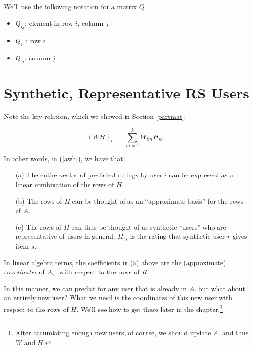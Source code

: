 We'll use the following notation for a matrix $Q$

\begin{itemize}

\item $Q_{ij}$:  element in row $i$, column $j$

\item $Q_{i \cdot}$:  row $i$

\item $Q_{\cdot j}$:  column $j$

\end{itemize}

\section{Synthetic, Representative RS Users}

Note the key relation, which we showed in Section \ref{partmat}:

\begin{equation}
(WH)_{i \cdot} = \sum_{m=1}^k W_{im} H_{m \cdot}
\end{equation}

In other words, in (\ref{awh}), we have that:

\begin{itemize}

\item [(a)] The entire vector of predicted ratings by user $i$ can be
expressed as a linear combination of the rows of $H$.

\item [(b)] The rows of $H$ can be thought of as an ``approximate basis'' for
the rows of $A$.

\item [(c)] The rows of $H$ can thus be thought of as synthetic
``users'' who are representative of users in general.  $H_{rs}$ is the
rating that synthetic user $r$ gives item $s$.

\end{itemize} 

In linear algebra terms, the coefficients in (a) above are the
(approximate) \textit{coordinates} of $A_{i \cdot}$ with respect to the
rows of $H$.

In this manner, we can predict for any user that is already in $A$.  but
what about an entirely new user?  What we need is the coordinates of
this new user with respect to the rows of $H$.  We'll see how to get
these later in the chapter.\footnote{After accumlating enough new users,
of course, we should update $A$, and thus $W$ and $H$.}

